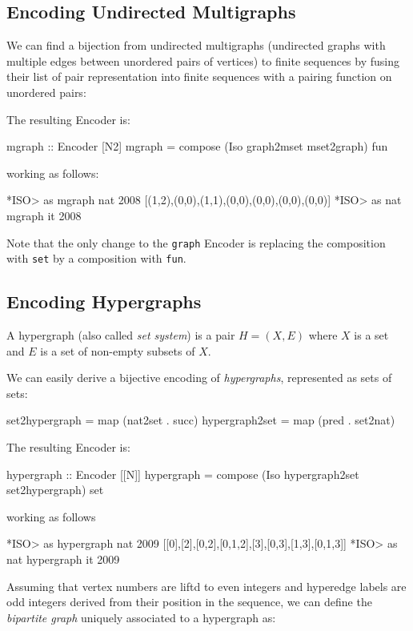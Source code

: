 \documentclass[]{INCLUDES/llncs}
\begin{document}
\subsection{Encoding Undirected Multigraphs} \label{mgraphs}
We can find a bijection from 
undirected multigraphs (undirected graphs with multiple edges between 
unordered pairs of
vertices) to finite sequences by fusing their list of pair
representation into finite sequences with a 
pairing function on unordered pairs:

The resulting Encoder is:
\begin{code}
mgraph :: Encoder [N2]
mgraph = compose (Iso graph2mset mset2graph) fun
\end{code}
working as follows:
\begin{codex}
*ISO> as mgraph nat 2008
[(1,2),(0,0),(1,1),(0,0),(0,0),(0,0),(0,0)]
*ISO> as nat mgraph it
2008
\end{codex}
Note that the only change to the {\tt graph} Encoder is replacing
the composition with {\tt set} by a composition with {\tt fun}.
 
\subsection{Encoding Hypergraphs}
\begin{df}
A hypergraph (also called {\em set system}) is a pair $H=(X,E)$ where
$X$ is a set and $E$ is a set of non-empty subsets of $X$.
\end{df}
We can easily
derive a bijective encoding of {\em hypergraphs}, 
represented as sets of sets:
\begin{code}
set2hypergraph = map (nat2set . succ)
hypergraph2set = map (pred . set2nat)
\end{code}
The resulting Encoder is:
\begin{code}
hypergraph :: Encoder [[N]]
hypergraph = compose (Iso hypergraph2set set2hypergraph) set
\end{code}
working as follows
\begin{codex}
*ISO> as hypergraph nat 2009
[[0],[2],[0,2],[0,1,2],[3],[0,3],[1,3],[0,1,3]]
*ISO> as nat hypergraph it
2009
\end{codex}
Assuming that vertex numbers are liftd to even integers and hyperedge labels are
odd integers derived from their position in the sequence,
we can define the {\em bipartite graph} uniquely associated to a hypergraph as:
\end{document}
